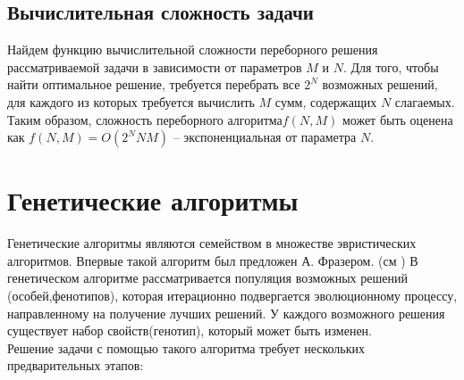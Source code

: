 \subsection{Вычислительная сложность задачи}\label{Osym}
Найдем функцию вычислительной сложности переборного решения рассматриваемой задачи в зависимости от параметров $M$ и $N$. Для того, чтобы найти оптимальное решение, требуется перебрать все $2^N$ возможных решений, для каждого из которых требуется вычислить $M$ сумм, содержащих $N$ слагаемых. Таким образом, сложность переборного алгоритма$f(N,M)$ может быть оценена как $f(N,M)=O(2^{N}NM)$ -- экспоненциальная от параметра $N$.
\section{Генетические алгоритмы}
Генетические алгоритмы являются семейством в множестве эвристических алгоритмов. Впервые такой алгоритм был предложен А. Фразером. (см \cite{Фразер1970})
В генетическом алгоритме рассматривается популяция возможных решений (особей,фенотипов), которая итерационно подвергается эволюционному процессу, направленному на получение лучших решений. У каждого возможного решения существует набор свойств(генотип), который может быть изменен.\\
Решение задачи с помощью такого алгоритма требует нескольких предварительных этапов:
